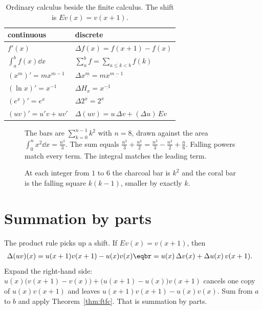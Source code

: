 \begin{table}[ht]
\centering
\begin{tabular}{ll}
\hline
continuous & discrete\\
\hline
$f'(x)$ & $\Delta f(x)=f(x+1)-f(x)$\\
$\int_a^bf(x)\dd x$ & $\sum_a^bf=\sum_{a\le k<b}f(k)$\\
$(x^m)'=mx^{m-1}$ & $\Delta x^{\underline m}=mx^{\underline{m-1}}$\\
$(\ln x)'=x^{-1}$ & $\Delta H_x=x^{\underline{-1}}$\\
$(e^x)'=e^x$ & $\Delta2^x=2^x$\\
$(uv)'=u'v+uv'$ & $\Delta(uv)=u\,\Delta v+(\Delta u)\,Ev$\\
\hline
\end{tabular}
\caption{Ordinary calculus beside the finite calculus. The shift is $Ev(x)=v(x+1)$.}
\label{tab:dictionary}
\end{table}

\begin{figure}[ht]
\centering
{}
\caption{The bars are $\sum_{k=0}^{n-1}k^2$ with $n=8$, drawn against the area $\int_0^nx^2\dd x=\frac{n^3}3$. The sum equals $\frac{n^{\underline3}}3+\frac{n^{\underline2}}2=\frac{n^3}3-\frac{n^2}2+\frac n6$. Falling powers match every term. The integral matches the leading term.}
\label{fig:staircase}
\end{figure}

\begin{figure}[ht]
\centering
{}
\caption{At each integer from $1$ to $6$ the charcoal bar is $k^2$ and the coral bar is the falling square $k(k-1)$, smaller by exactly $k$.}
\label{fig:rw01-falling}
\end{figure}

\section{Summation by parts}

The product rule picks up a shift. If $Ev(x)=v(x+1)$, then
\[
\begin{aligned}\Delta(uv)(x)&=u(x+1)v(x+1)-u(x)v(x)\eqbr=u(x)\,\Delta v(x)+\Delta u(x)\,v(x+1).\end{aligned}
\]
Expand the right-hand side: $u(x)\bigl(v(x+1)-v(x)\bigr)+\bigl(u(x+1)-u(x)\bigr)v(x+1)$ cancels one copy of $u(x)v(x+1)$ and leaves $u(x+1)v(x+1)-u(x)v(x)$. Sum from $a$ to $b$ and apply Theorem~\ref{thm:ftfc}. That is summation by parts.

